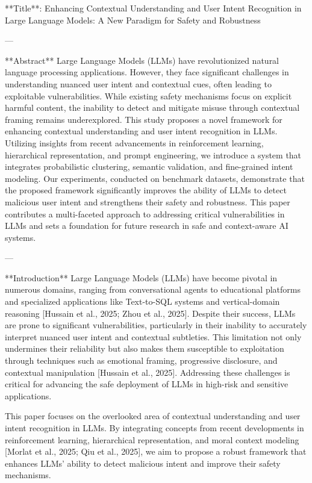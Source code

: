 **Title**: Enhancing Contextual Understanding and User Intent Recognition in Large Language Models: A New Paradigm for Safety and Robustness

---

**Abstract**  
Large Language Models (LLMs) have revolutionized natural language processing applications. However, they face significant challenges in understanding nuanced user intent and contextual cues, often leading to exploitable vulnerabilities. While existing safety mechanisms focus on explicit harmful content, the inability to detect and mitigate misuse through contextual framing remains underexplored. This study proposes a novel framework for enhancing contextual understanding and user intent recognition in LLMs. Utilizing insights from recent advancements in reinforcement learning, hierarchical representation, and prompt engineering, we introduce a system that integrates probabilistic clustering, semantic validation, and fine-grained intent modeling. Our experiments, conducted on benchmark datasets, demonstrate that the proposed framework significantly improves the ability of LLMs to detect malicious user intent and strengthens their safety and robustness. This paper contributes a multi-faceted approach to addressing critical vulnerabilities in LLMs and sets a foundation for future research in safe and context-aware AI systems.

---

**Introduction**  
Large Language Models (LLMs) have become pivotal in numerous domains, ranging from conversational agents to educational platforms and specialized applications like Text-to-SQL systems and vertical-domain reasoning [Hussain et al., 2025; Zhou et al., 2025]. Despite their success, LLMs are prone to significant vulnerabilities, particularly in their inability to accurately interpret nuanced user intent and contextual subtleties. This limitation not only undermines their reliability but also makes them susceptible to exploitation through techniques such as emotional framing, progressive disclosure, and contextual manipulation [Hussain et al., 2025]. Addressing these challenges is critical for advancing the safe deployment of LLMs in high-risk and sensitive applications.

This paper focuses on the overlooked area of contextual understanding and user intent recognition in LLMs. By integrating concepts from recent developments in reinforcement learning, hierarchical representation, and moral context modeling [Morlat et al., 2025; Qiu et al., 2025], we aim to propose a robust framework that enhances LLMs' ability to detect malicious intent and improve their safety mechanisms.

